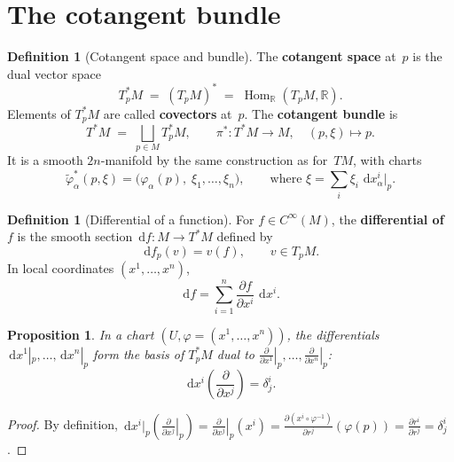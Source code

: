 \documentclass[12pt,a4paper,openany]{book}
\newtheorem{proposition}[theorem]{Proposition}
\theoremstyle{definition}
\newtheorem{definition}[theorem]{Definition}
\theoremstyle{remark}
\newcommand{\R}{\mathbb{R}}
\newcommand{\dd}{\,\mathrm{d}}
\DeclareMathOperator{\Hom}{Hom}
\begin{document}
\section{The cotangent bundle}\label{sec:cotangent-bundle}

\begin{definition}[Cotangent space and bundle]\label{def:cotangent}%
The \textbf{cotangent space} at~$p$ is the dual vector space
\[
  T_p^*M \;=\; (T_pM)^* \;=\; \Hom_\R(T_pM, \R).
\]
Elements of $T_p^*M$ are called \textbf{covectors} at~$p$.
The \textbf{cotangent bundle} is
\[
  T^*M \;=\; \bigsqcup_{p \in M} T_p^*M,
  \qquad \pi^* \colon T^*M \to M,\quad (p, \xi) \mapsto p.
\]
It is a smooth $2n$-manifold by the same construction as for~$TM$, with
charts
\[
  \widetilde{\varphi}_\alpha^*(p, \xi)
  = \bigl(\varphi_\alpha(p),\; \xi_1, \dots, \xi_n\bigr),
  \qquad\text{where } \xi = \sum_i \xi_i\, \dd x^i_\alpha\big|_p.
\]
\end{definition}

\begin{definition}[Differential of a function]\label{def:df}%
For $f \in C^\infty(M)$, the \textbf{differential of $f$} is the smooth
section $\dd f \colon M \to T^*M$ defined by
\[
  \dd f_p(v) = v(f), \qquad v \in T_pM.
\]
In local coordinates $(x^1, \dots, x^n)$,
\[
  \dd f = \sum_{i=1}^n \frac{\partial f}{\partial x^i}\, \dd x^i.
\]
\end{definition}

\begin{proposition}\label{prop:cotangent-basis}%
In a chart $(U, \varphi = (x^1, \dots, x^n))$, the differentials
$\dd x^1|_p, \dots, \dd x^n|_p$ form the basis of $T_p^*M$ dual to
$\left.\frac{\partial}{\partial x^1}\right|_p, \dots,
\left.\frac{\partial}{\partial x^n}\right|_p$:
\[
  \dd x^i\!\left(\frac{\partial}{\partial x^j}\right) = \delta^i_j.
\]
\end{proposition}

\begin{proof}
By definition,
$\dd x^i|_p\!\left(\left.\frac{\partial}{\partial x^j}\right|_p\right)
= \left.\frac{\partial}{\partial x^j}\right|_p(x^i)
= \frac{\partial (x^i \circ \varphi^{-1})}{\partial r^j}(\varphi(p))
= \frac{\partial r^i}{\partial r^j} = \delta^i_j$.
\end{proof}
\end{document}
